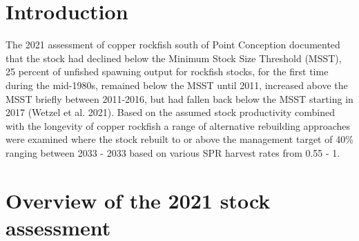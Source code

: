 \documentclass[11pt,
  english,
  a4paper,
]{article}
\begin{document}
\leavevmode\tagmcend\tagstructend\par

\pagebreak
\setlength{\parskip}{5mm plus1mm minus1mm}
\setcounter{page}{1}
\renewcommand{\thefigure}{\arabic{figure}}
\renewcommand{\thetable}{\arabic{table}}
\setcounter{table}{0}
\setcounter{figure}{0}

\setlength\parskip{0.2em plus 0.1em minus 0.2em}


\hypertarget{introduction}{%
\section{Introduction}\label{introduction}}

\leavevmode\tagmcend\tagstructend


The 2021 assessment of copper rockfish south of Point Conception documented that the stock had declined below the Minimum Stock Size Threshold (MSST), 25 percent of unfished spawning output for rockfish stocks, for the first time during the mid-1980s, remained below the MSST until 2011, increased above the MSST briefly between 2011-2016, but had fallen back below the MSST starting in 2017 {(Wetzel et al. 2021)\leavevmode\tagmcend\tagstructend}. Based on the assumed stock productivity combined with the longevity of copper rockfish a range of alternative rebuilding approaches were examined where the stock rebuilt to or above the management target of 40\% ranging between 2033 - 2033 based on various SPR harvest rates from 0.55 - 1.

\leavevmode\tagmcend\tagstructend\par


\hypertarget{overview-of-the-2021-stock-assessment}{%
\section{Overview of the 2021 stock assessment}\label{overview-of-the-2021-stock-assessment}}

\leavevmode\tagmcend\tagstructend

\end{document}
